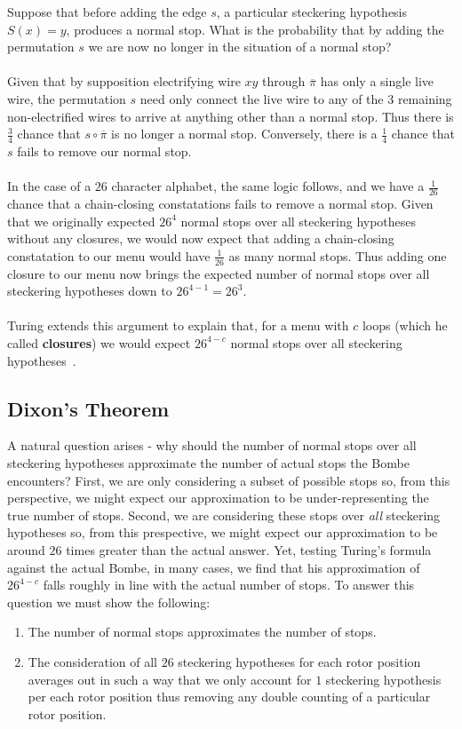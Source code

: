 \noindent Suppose that before adding the edge $s$, a particular
steckering hypothesis $S(x) = y$,
produces a normal stop.
What is the probability that by adding the permutation $s$ we are now
no longer in the situation of a normal stop?
\\\\Given that by supposition electrifying wire $xy$ through
$\overline\pi$ has only a single live wire, the permutation $s$ need
only connect the live wire to any of the $3$ remaining
non-electrified wires to arrive at anything other than a normal stop.
Thus there is $\frac{3}{4}$ chance that $s\circ\overline\pi$ is no
longer a normal stop. Conversely, there is a $\frac{1}{4}$ chance
that $s$ fails to remove our normal stop.
\\\\In the case of a $26$ character alphabet, the same logic follows,
and we have a $\frac{1}{26}$ chance that a chain-closing
constatations fails to remove a normal stop. Given that we originally
expected $26^4$ normal stops over all steckering hypotheses without
any closures, we would now expect that adding a chain-closing
constatation to our menu would have $\frac{1}{26}$ as many normal
stops. Thus adding one closure to our menu now brings the expected
number of normal stops over all steckering hypotheses down to $26^{4-1} = 26^3$.
\\\\Turing extends this argument to explain that, for a menu with $c$
loops (which he called {\bf{closures}}) we would expect $26^{4-c}$
normal stops over all steckering hypotheses~\cite[p.~116]{Turing1940ProfBook}.
\subsection{Dixon's Theorem}
A natural question arises - why should the number of normal stops
over all steckering hypotheses approximate the number of actual stops
the Bombe encounters?
First, we are only considering a subset of possible stops so, from
this perspective, we might
expect our approximation to be under-representing the true number of
stops. Second, we are considering these
stops over \emph{all} steckering hypotheses so, from this
prespective, we might expect our
approximation to be around $26$ times greater than the actual answer.
Yet, testing Turing's formula against the actual Bombe, in many cases,
we find that his approximation of $26^{4-c}$ falls roughly in line
with the actual number of stops. To answer this question we must show
the following:
\begin{enumerate}[(1)]
  \item The number of normal stops approximates the number of stops.
  \item The consideration of all $26$ steckering hypotheses for each
    rotor position averages out in such a way that we only account for $1$
    steckering hypothesis per each rotor position thus removing any
    double counting of a particular rotor position.
\end{enumerate}
